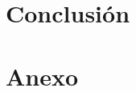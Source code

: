 \documentclass[11pt]{article}
\begin{document}
\section{Conclusión}


\section{Anexo}


\printbibliography

%
\end{document}
